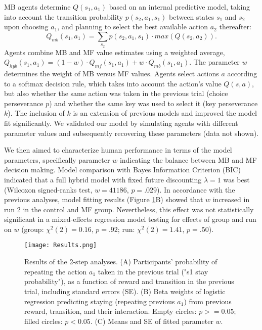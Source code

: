 \documentclass[11pt]{article} %
\begin{document}
MB agents determine $Q(s_{1}, a_{1})$ based on an internal predictive model, taking into account the transition probability $p(s_{2}, a_{1}, s_{1})$ between states $s_{1}$ and $s_{2}$ upon choosing $a_{1}$, and planning to select the best available action $a_{2}$ thereafter:
%
\begin{equation}
Q_{mb}(s_{1}, a_{1}) = \sum_{s_{2}} p(s_{2}, a_{1}, s_{1}) \cdot max(Q(s_{2}, a_{2})).
\end{equation}
%
Agents combine MB and MF value estimates using a weighted average, $Q_{hyb}(s_{1}, a_{1}) = (1 - w) \cdot Q_{mf}(s_{1}, a_{1}) + w \cdot Q_{mb}(s_{1}, a_{1})$. The parameter $w$ determines the weight of MB versus MF values. Agents select actions $a$ according to a softmax decision rule, which takes into account the action's value $Q(s, a)$, but also whether the same action was taken in the previous trial (choice perseverance $p$) and whether the same key was used to select it (key perseverance $k$). The inclusion of $k$ is an extension of previous models and improved the model fit significantly. We validated our model by simulating agents with different parameter values and subsequently recovering these parameters (data not shown).

We then aimed to characterize human performance in terms of the model parameters, specifically parameter $w$ indicating the balance between MB and MF decision making. Model comparison with Bayes Information Criterion (BIC) indicated that a full hybrid model with fixed future discounting $\lambda=1$ was best (Wilcoxon signed-ranks test, $w = 41186$, $p = .029$). In accordance with the previous analyses, model fitting results (Figure \ref{Results}B) showed that $w$ increased in run 2 in the control and MF group. Nevertheless, this effect was not statistically significant in a mixed-effects regression model testing for effects of group and run on $w$ (group: $\chi^{2}(2)=0.16$, $p = .92$; run: $\chi^{2}(2)=1.41$, $p = .50$).
%
\begin{figure}
	\texttt{[image: Results.png]}
	\caption{Results of the 2-step analyses. (A) Participants' probability of repeating the action $a_{1}$ taken in the previous trial ("s1 stay probability"), as a function of reward and transition in the previous trial, including standard errors (SE). (B) Beta weights of logistic regression predicting staying (repeating previous $a_{1}$) from previous reward, transition, and their interaction. Empty circles: $p >= 0.05$; filled circles: $p < 0.05$. (C) Means and SE of fitted parameter $w$.}
	\label{Results}
\end{figure}
%
\end{document}
